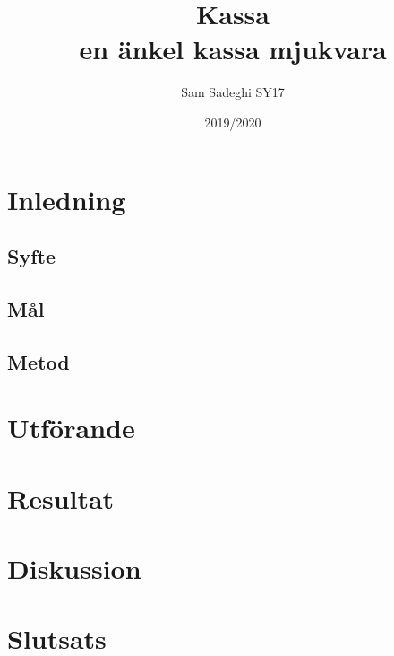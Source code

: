 \documentclass[a4paper, 12pt]{article}
\title{Kassa\\\large en änkel kassa mjukvara}
\author{Sam Sadeghi SY17}
\date{2019/2020}
\begin{document}
\begin{titlepage}
\maketitle
\end{titlepage}
\begin{abstract}

\end{abstract}
\newpage
\tableofcontents
\newpage

\section{Inledning}

\subsection{Syfte}

\subsection{Mål}

\subsection{Metod}

\section{Utförande}

\section{Resultat}

\section{Diskussion}

\section{Slutsats}

\newpage 

\printbibliography
\end{document}

